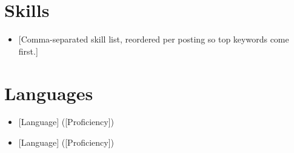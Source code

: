 \documentclass[letterpaper, 11pt]{article}
\makeatletter
\newcommand{\resumeSubheading}[4]{
  \vspace{-1pt}
\item
  \begin{tabular*}{0.97\textwidth}[t]{l@{\extracolsep{\fill}}r}
    \textbf{#1} & \textit{\small #2} \\
    \textit{#3} & \textit{\small #4} \\
  \end{tabular*}\vspace{-5pt}
}
\newcommand{\resumeItemPlain}[1]{
\item\small{ {#1 \vspace{-2pt}} }
}
\newcommand{\resumeSubHeadingListStart}{\begin{itemize}[leftmargin=*]}
\newcommand{\resumeSubHeadingListEnd}{\end{itemize}}
\makeatother
\begin{document}
\section{Skills}
\resumeSubHeadingListStart
\resumeItemPlain{[Comma-separated skill list, reordered per posting so top keywords come first.]}
\resumeSubHeadingListEnd

\section{Languages}
\resumeSubHeadingListStart
\resumeItemPlain{[Language] ([Proficiency])}
\resumeItemPlain{[Language] ([Proficiency])}
\resumeSubHeadingListEnd


\end{document}
